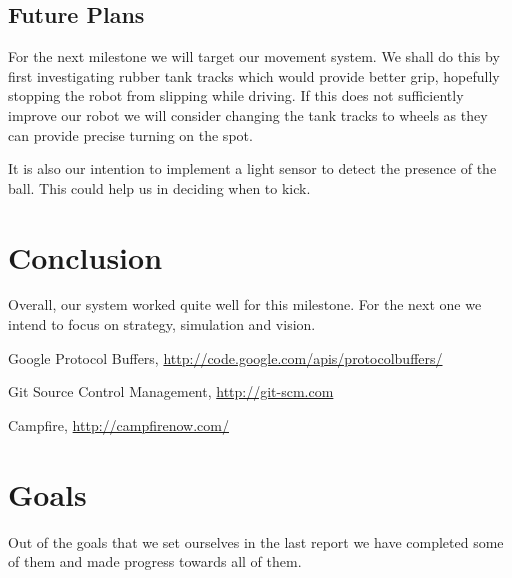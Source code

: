 \documentclass[12pt, a4paper, titlepage]{article}
\begin{document}
\subsection{Future Plans}

For the next milestone we will target our movement system. We shall do this
by first investigating rubber tank tracks which would provide better grip,
hopefully stopping the robot from slipping while driving. If this does not
sufficiently improve our robot we will consider changing the tank tracks to
wheels as they can provide precise turning on the spot.

It is also our intention to implement a light sensor to detect the presence of
the ball. This could help us in deciding when to kick.

\section{Conclusion}

Overall, our system worked quite well for this milestone. For the next one we
intend to focus on strategy, simulation and vision.

\newpage

\setcounter{section}{5}
\begin{thebibliography}{9}

	Google Protocol Buffers,
	\url{http://code.google.com/apis/protocolbuffers/}

	Git Source Control Management,
	\url{http://git-scm.com}

	Campfire,
	\url{http://campfirenow.com/}

\end{thebibliography}

\appendix

\section{Goals}

Out of the goals that we set ourselves in the last report we have completed some
of them and made progress towards all of them.\\
\end{document}

